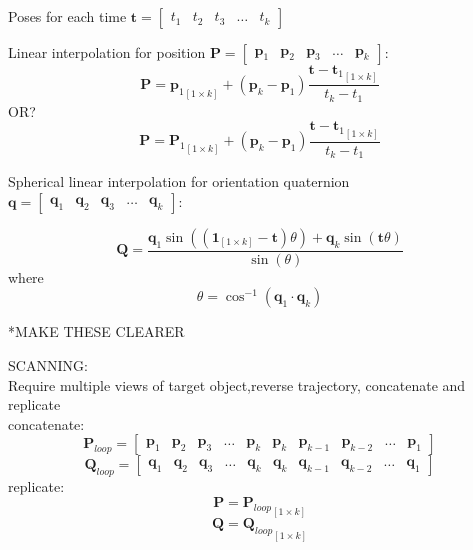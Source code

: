 Poses for each time $\mathbf{t} =
					\begin{bmatrix}
						t_1 & t_2 & t_3 & \dots & t_k
					\end{bmatrix}$

Linear interpolation for position $\mathbf{P}= \begin{bmatrix}
													\mathbf{p}_1 & \mathbf{p}_2 & \mathbf{p}_3 & \dots & \mathbf{p}_k
											   \end{bmatrix}$:
\begin{equation}
	\mathbf{P} = 
	{\mathbf{p}_1}_{[1 \times k]} + (\mathbf{p}_k - \mathbf{p}_1)\frac{\mathbf{t}-{\mathbf{t}_1}_{[1 \times k]}}{t_k - t_1}
\end{equation}
OR?
\begin{equation}
	\mathbf{P} = 
	{\mathbf{P}_1}_{[1 \times k]} + (\mathbf{p}_k - \mathbf{p}_1)\frac{\mathbf{t}-{\mathbf{t}_1}_{[1 \times k]}}{t_k - t_1}
\end{equation}


Spherical linear interpolation for orientation quaternion $\mathbf{q}= \begin{bmatrix}
													\mathbf{q}_1 & \mathbf{q}_2 & \mathbf{q}_3 & \dots & \mathbf{q}_k
												\end{bmatrix}$:

\begin{equation} \label{slerp}
	\mathbf{Q} = \frac{\mathbf{q}_1\sin((\mathbf{1}_{[1 \times k]}-\mathbf{t})\theta) + \mathbf{q}_k\sin(\mathbf{t}\theta)}{\sin(\theta)}
\end{equation}
where
\begin{equation}
	\theta = \cos^{-1}(\mathbf{q}_1 \cdot \mathbf{q}_k)
\end{equation}

*MAKE THESE CLEARER

SCANNING:\\
Require multiple views of target object,reverse trajectory, concatenate and replicate\\
concatenate:\\
\begin{equation}
	\mathbf{P}_{loop}= 
	\begin{bmatrix}
		\mathbf{p}_1 & \mathbf{p}_2 & \mathbf{p}_3 & \dots & \mathbf{p}_k &
		\mathbf{p}_{k} & \mathbf{p}_{k-1} & \mathbf{p}_{k-2} & \dots & \mathbf{p}_1
	\end{bmatrix}
\end{equation}
\begin{equation}
	\mathbf{Q}_{loop}= 
	\begin{bmatrix}
		\mathbf{q}_1 & \mathbf{q}_2 & \mathbf{q}_3 & \dots & \mathbf{q}_k &
		\mathbf{q}_{k} & \mathbf{q}_{k-1} & \mathbf{q}_{k-2} & \dots & \mathbf{q}_1
	\end{bmatrix}
\end{equation}
replicate:
\begin{equation}
	\mathbf{P} = {\mathbf{P}_{loop}}_{[1 \times k]}
\end{equation}
\begin{equation}
	\mathbf{Q} = {\mathbf{Q}_{loop}}_{[1 \times k]}
\end{equation}



